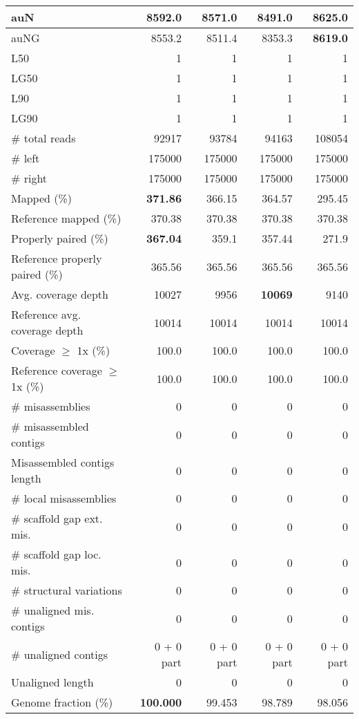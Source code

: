 \documentclass[12pt,a4paper]{article}
\begin{document}
\begin{table}[ht]
\begin{center}
\begin{tabular}{|l*{4}{|r}|}
auN & 8592.0 & 8571.0 & 8491.0 & {\bf 8625.0} \\ \hline
auNG & 8553.2 & 8511.4 & 8353.3 & {\bf 8619.0} \\ \hline
L50 & 1 & 1 & 1 & 1 \\ \hline
LG50 & 1 & 1 & 1 & 1 \\ \hline
L90 & 1 & 1 & 1 & 1 \\ \hline
LG90 & 1 & 1 & 1 & 1 \\ \hline
\# total reads & 92917 & 93784 & 94163 & 108054 \\ \hline
\# left & 175000 & 175000 & 175000 & 175000 \\ \hline
\# right & 175000 & 175000 & 175000 & 175000 \\ \hline
Mapped (\%) & {\bf 371.86} & 366.15 & 364.57 & 295.45 \\ \hline
Reference mapped (\%) & 370.38 & 370.38 & 370.38 & 370.38 \\ \hline
Properly paired (\%) & {\bf 367.04} & 359.1 & 357.44 & 271.9 \\ \hline
Reference properly paired (\%) & 365.56 & 365.56 & 365.56 & 365.56 \\ \hline
Avg. coverage depth & 10027 & 9956 & {\bf 10069} & 9140 \\ \hline
Reference avg. coverage depth & 10014 & 10014 & 10014 & 10014 \\ \hline
Coverage $\geq$ 1x (\%) & 100.0 & 100.0 & 100.0 & 100.0 \\ \hline
Reference coverage $\geq$ 1x (\%) & 100.0 & 100.0 & 100.0 & 100.0 \\ \hline
\# misassemblies & 0 & 0 & 0 & 0 \\ \hline
\# misassembled contigs & 0 & 0 & 0 & 0 \\ \hline
Misassembled contigs length & 0 & 0 & 0 & 0 \\ \hline
\# local misassemblies & 0 & 0 & 0 & 0 \\ \hline
\# scaffold gap ext. mis. & 0 & 0 & 0 & 0 \\ \hline
\# scaffold gap loc. mis. & 0 & 0 & 0 & 0 \\ \hline
\# structural variations & 0 & 0 & 0 & 0 \\ \hline
\# unaligned mis. contigs & 0 & 0 & 0 & 0 \\ \hline
\# unaligned contigs & 0 + 0 part & 0 + 0 part & 0 + 0 part & 0 + 0 part \\ \hline
Unaligned length & 0 & 0 & 0 & 0 \\ \hline
Genome fraction (\%) & {\bf 100.000} & 99.453 & 98.789 & 98.056 \\ \hline

\end{tabular}
\end{center}
\end{table}
\end{document}
